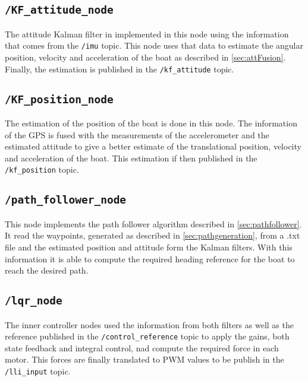\subsection*{\lstinline[style=cinline]{/KF_attitude_node}}
The attitude Kalman filter in implemented in this node using the information that comes from the \lstinline[style=cinline]{/imu} topic. This node uses that data to estimate the angular position, velocity and acceleration of the boat as described in \autoref{sec:attFusion}. Finally, the estimation is published in the \lstinline[style=cinline]{/kf_attitude} topic.

\subsection*{\lstinline[style=cinline]{/KF_position_node}}
The estimation of the position of the boat is done in this node. The information of the GPS is fused with the measurements of the accelerometer and the estimated attitude to give a better estimate of the translational position, velocity and acceleration of the boat. This estimation if then  published in the \lstinline[style=cinline]{/kf_position} topic.

\subsection*{\lstinline[style=cinline]{/path_follower_node}}
This node implements the path follower algorithm described in \autoref{sec:pathfollower}. It read the waypoints, generated as described in \autoref{sec:pathgeneration}, from a .txt file and the estimated position and attitude form the Kalman filters. With this information it is able to compute the required heading reference for the boat to reach the desired path.

\subsection*{\lstinline[style=cinline]{/lqr_node}}
The inner controller nodes used the information from both filters as well as the reference published in the \lstinline[style=cinline]{/control_reference} topic to apply the gains, both state feedback and integral control, nad compute the required force in each motor. This forces are finally translated to PWM values to be publish in the \lstinline[style=cinline]{/lli_input} topic.